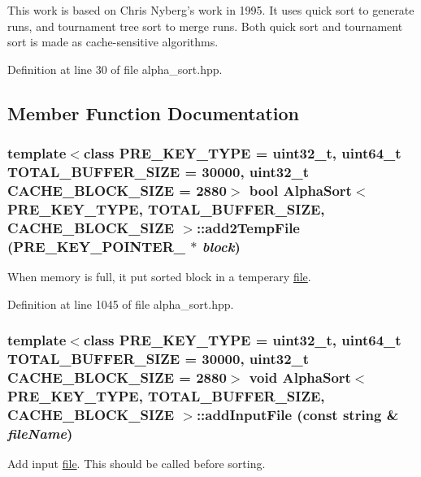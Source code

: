 This work is based on Chris Nyberg’s work in 1995. It uses quick sort to generate runs, and tournament tree sort to merge runs. Both quick sort and tournament sort is made as cache-sensitive algorithms. 

Definition at line 30 of file alpha\_\-sort.hpp.

\subsection{Member Function Documentation}
\hypertarget{classAlphaSort_7c2832c30251b6901ca705f1d442051f}{
\subsubsection[{add2TempFile}]{\setlength{\rightskip}{0pt plus 5cm}template$<$class PRE\_\-KEY\_\-TYPE  = uint32\_\-t, uint64\_\-t TOTAL\_\-BUFFER\_\-SIZE = 30000, uint32\_\-t CACHE\_\-BLOCK\_\-SIZE = 2880$>$ bool {\bf AlphaSort}$<$ PRE\_\-KEY\_\-TYPE, TOTAL\_\-BUFFER\_\-SIZE, CACHE\_\-BLOCK\_\-SIZE $>$::add2TempFile (PRE\_\-KEY\_\-POINTER\_\- $\ast$ {\em block})}}
\label{classAlphaSort_7c2832c30251b6901ca705f1d442051f}


When memory is full, it put sorted block in a temperary \hyperlink{classfile}{file}. 

Definition at line 1045 of file alpha\_\-sort.hpp.\hypertarget{classAlphaSort_7484f1a82e99c0f120e8fa3abaa23433}{
\subsubsection[{addInputFile}]{\setlength{\rightskip}{0pt plus 5cm}template$<$class PRE\_\-KEY\_\-TYPE  = uint32\_\-t, uint64\_\-t TOTAL\_\-BUFFER\_\-SIZE = 30000, uint32\_\-t CACHE\_\-BLOCK\_\-SIZE = 2880$>$ void {\bf AlphaSort}$<$ PRE\_\-KEY\_\-TYPE, TOTAL\_\-BUFFER\_\-SIZE, CACHE\_\-BLOCK\_\-SIZE $>$::addInputFile (const string \& {\em fileName})}}
\label{classAlphaSort_7484f1a82e99c0f120e8fa3abaa23433}


Add input \hyperlink{classfile}{file}. This should be called before sorting. 

